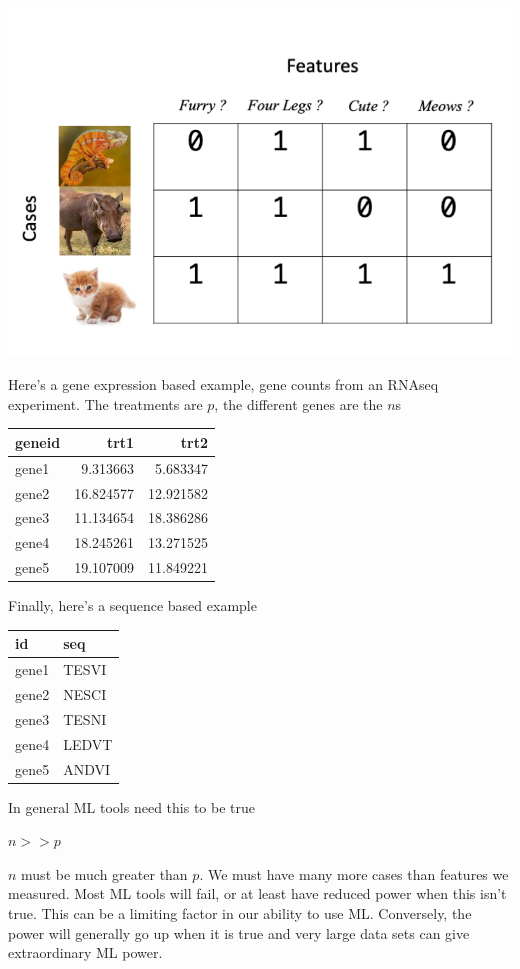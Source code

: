 \documentclass[
]{book}
\begin{document}
\includegraphics{figs/npmat.png}

Here's a gene expression based example, gene counts from an RNAseq experiment. The treatments are \(p\), the different genes are the \(n\)s

\begin{tabular}{l|r|r}
\hline
geneid & trt1 & trt2\\
\hline
gene1 & 9.313663 & 5.683347\\
\hline
gene2 & 16.824577 & 12.921582\\
\hline
gene3 & 11.134654 & 18.386286\\
\hline
gene4 & 18.245261 & 13.271525\\
\hline
gene5 & 19.107009 & 11.849221\\
\hline
\end{tabular}

Finally, here's a sequence based example

\begin{tabular}{l|l}
\hline
id & seq\\
\hline
gene1 & TESVI\\
\hline
gene2 & NESCI\\
\hline
gene3 & TESNI\\
\hline
gene4 & LEDVT\\
\hline
gene5 & ANDVI\\
\hline
\end{tabular}

In general ML tools need this to be true

\(n >> p\)

\(n\) must be much greater than \(p\). We must have many more cases than features we measured. Most ML tools will fail, or at least have reduced power when this isn't true. This can be a limiting factor in our ability to use ML. Conversely, the power will generally go up when it is true and very large data sets can give extraordinary ML power.
\end{document}
